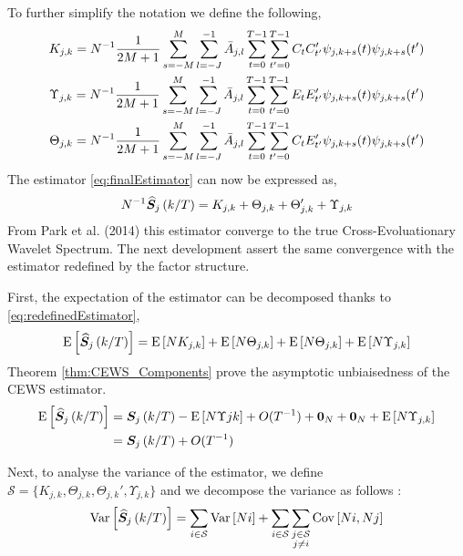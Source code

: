 \documentclass[main_document.tex]{subfiles}
\begin{document}
To further simplify the notation we define the following, 
\begin{align}
	K_{j,k} = N^{-1} \frac{\displaystyle 1}{\displaystyle 2M+1} \sum_{s=-M}^{M} \scalesum{l} \invA{j}{l} \locsum{t}\locsum{t'} C_t C_{t'}' \wavelet{j}{k+s}{t}\wavelet{j}{k+s}{t'} \label{eq:Kappa} \\
	\Upsilon_{j,k} = N^{-1} \frac{\displaystyle 1}{\displaystyle 2M+1} \sum_{s=-M}^{M} \scalesum{l} \invA{j}{l} \locsum{t}\locsum{t'} E_t E_{t'}' \wavelet{j}{k+s}{t}\wavelet{j}{k+s}{t'} \label{eq:Upsilon} \\
	\Theta_{j,k} = N^{-1} \frac{\displaystyle 1}{\displaystyle 2M+1} \sum_{s=-M}^{M} \scalesum{l} \invA{j}{l} \locsum{t}\locsum{t'} C_t E_{t'}' \wavelet{j}{k+s}{t}\wavelet{j}{k+s}{t'} \label{eq:Theta} 
\end{align}
The estimator \eqref{eq:finalEstimator} can now be expressed as, 
\begin{align}
	N^{-1} \widehat{\bm{S}}_{j}\left(k/T\right) = K_{j,k} + \Theta_{j,k} + \Theta_{j,k}' + \Upsilon_{j,k} \label{eq:redefinedEstimator}
\end{align}
From Park et al. (2014) this estimator converge to the true Cross-Evoluationary Wavelet Spectrum. The next development assert the same convergence with the estimator redefined by the factor structure. 

First, the expectation of the estimator can be decomposed thanks to \eqref{eq:redefinedEstimator},
\begin{align*}
	\mathrm{E}\left[\widehat{\bm{S}}_{j}\left(k/T\right)\right] = \mathrm{E}\left[N K_{j,k}\right] + \mathrm{E}\left[N \Theta_{j,k}\right] + \mathrm{E}\left[N \Theta_{j,k}\right] + \mathrm{E}\left[N \Upsilon_{j,k}\right]
\end{align*}
Theorem \ref{thm:CEWS_Components} prove the asymptotic unbiaisedness of the CEWS estimator.
\begin{align*}
	\mathrm{E}\left[\widehat{\bm{S}}_{j}\left(k/T\right)\right] &= \bm{S}_{j}\left(k/T\right) - \mathrm{E}\left[N\Upsilon{j}{k}\right] + O(T^{-1}) + \bm{0}_{N} + \bm{0}_{N} + \mathrm{E}\left[N \Upsilon_{j,k}\right] \\
				    &= \bm{S}_{j}\left(k/T\right) + O(T^{-1})
\end{align*}

Next, to analyse the variance of the estimator, we define $\mathcal{S} = \{ K_{j,k}, \Theta_{j,k}, \Theta_{j,k}', \Upsilon_{j,k} \}$ and we decompose the variance as follows : 
\begin{align}\label{eq:estimatorVariance}
	\Var{\estimCEWS{j}{k}} = \sum_{i \in \mathcal{S}} \Var{N i} + \sum_{i \in \mathcal{S}} \sum_{\substack{j \in \mathcal{S} \\ j \neq i}} \Cov{Ni}{N j}
\end{align}
\end{document}
